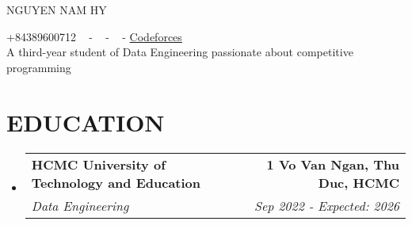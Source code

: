 \documentclass[letterpaper,11pt]{article}
\makeatletter
\newcommand{\resumeSubheading}[4]{
  \vspace{-2pt}\item
    \begin{tabular*}{1.0\textwidth}[t]{l@{\extracolsep{\fill}}r}
      \textbf{\large#1} & \textbf{\small #2} \\
      \textit{\large#3} & \textit{\small #4} \\
      
    \end{tabular*}\vspace{-7pt}
}
\newcommand{\resumeSubHeadingListStart}{\begin{itemize}[leftmargin=0.0in, label={}]}
\newcommand{\resumeSubHeadingListEnd}{\end{itemize}}
\makeatother
\begin{document}


\begin{center}
    {\huge NGUYEN NAM HY} \\ \vspace{2pt} 

    {+84389600712 } ~
    \small{-}
    \href{mailto:nguyennamhy812@gmail.com}{\color{blue}{nguyennamhy812@gmail.com}} ~ 
    \small{-}
    \href{github.com/hvmegy}{ \color{blue}{Github}} ~
    \small{-}
    \href{https://codeforces.com/profile/FortuneWillWinICPC}{\color{blue}Codeforces}\\
    {A third-year student of Data Engineering passionate  about competitive programming} \\
    \vspace{-7pt}

\end{center}

\section{\color{airforceblue}EDUCATION}
  \resumeSubHeadingListStart
    \resumeSubheading
      {HCMC University of Technology and Education}{1 Vo Van Ngan, Thu Duc, HCMC}
      {Data Engineering}{Sep 2022 - Expected: 2026}
  \resumeSubHeadingListEnd
  \vspace{-10pt}

\end{document}
